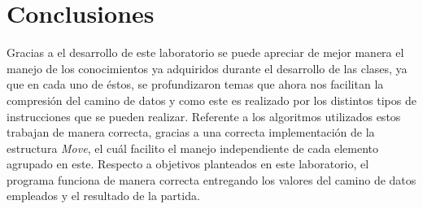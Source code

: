 \section{Conclusiones}

Gracias a el desarrollo de este laboratorio se puede apreciar de mejor manera el manejo de los conocimientos ya adquiridos durante el desarrollo de las clases, ya que en cada uno de éstos, se profundizaron temas que ahora nos facilitan la compresión del camino de datos y como este es realizado por los distintos tipos de instrucciones que se pueden realizar. Referente a los algoritmos utilizados estos trabajan de manera correcta, gracias a una correcta implementación de la estructura \textit{Move}, el cuál facilito el manejo independiente de cada elemento agrupado en este. Respecto a objetivos planteados en este laboratorio, el programa funciona de manera correcta entregando los valores del camino de datos empleados y el resultado de la partida. 

